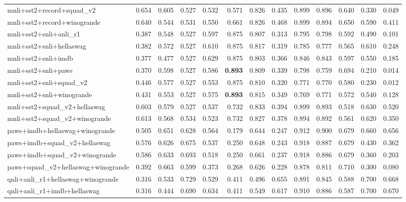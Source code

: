 \begin{table}[t]
\begin{tabular}{lrrrrrrrrrrrr}
    mnli+sst2+record+squad\_v2 & 0.654 & 0.605 & 0.527 & 0.532 & 0.571 & 0.826 & 0.435 & 0.899 & 0.896 & 0.640 & 0.330 & 0.049 \\
    mnli+sst2+record+winogrande & 0.640 & 0.544 & 0.531 & 0.550 & 0.661 & 0.826 & 0.468 & 0.899 & 0.894 & 0.650 & 0.590 & 0.411 \\
    mnli+sst2+snli+anli\_r1 & 0.387 & 0.548 & 0.527 & 0.597 & 0.875 & 0.807 & 0.313 & 0.795 & 0.798 & 0.592 & 0.490 & 0.101 \\
    mnli+sst2+snli+hellaswag & 0.382 & 0.572 & 0.527 & 0.610 & 0.875 & 0.817 & 0.319 & 0.785 & 0.777 & 0.565 & 0.610 & 0.248 \\
    mnli+sst2+snli+imdb & 0.377 & 0.477 & 0.527 & 0.629 & 0.875 & 0.803 & 0.366 & 0.846 & 0.843 & 0.597 & 0.550 & 0.185 \\
    mnli+sst2+snli+paws & 0.370 & 0.598 & 0.527 & 0.586 & \textbf{0.893} & 0.809 & 0.339 & 0.798 & 0.759 & 0.694 & 0.210 & 0.014 \\
    mnli+sst2+snli+squad\_v2 & 0.446 & 0.577 & 0.527 & 0.553 & 0.875 & 0.810 & 0.320 & 0.771 & 0.770 & 0.580 & 0.230 & 0.012 \\
    mnli+sst2+snli+winogrande & 0.431 & 0.553 & 0.527 & 0.575 & \textbf{0.893} & 0.815 & 0.349 & 0.769 & 0.771 & 0.572 & 0.540 & 0.128 \\
    mnli+sst2+squad\_v2+hellaswag & 0.603 & 0.579 & 0.527 & 0.537 & 0.732 & 0.833 & 0.394 & 0.899 & 0.893 & 0.518 & 0.630 & 0.520 \\
    mnli+sst2+squad\_v2+winogrande & 0.613 & 0.568 & 0.534 & 0.523 & 0.732 & 0.827 & 0.378 & 0.894 & 0.892 & 0.561 & 0.620 & 0.350 \\
    paws+imdb+hellaswag+winogrande & 0.505 & 0.651 & 0.628 & 0.564 & 0.179 & 0.644 & 0.247 & 0.912 & 0.900 & 0.679 & 0.660 & 0.656 \\
    paws+imdb+squad\_v2+hellaswag & 0.576 & 0.626 & 0.675 & 0.537 & 0.250 & 0.648 & 0.243 & 0.918 & 0.887 & 0.679 & 0.430 & 0.362 \\
    paws+imdb+squad\_v2+winogrande & 0.586 & 0.633 & 0.693 & 0.518 & 0.250 & 0.661 & 0.237 & 0.918 & 0.886 & 0.679 & 0.360 & 0.203 \\
    paws+squad\_v2+hellaswag+winogrande & 0.392 & 0.663 & 0.599 & 0.373 & 0.268 & 0.626 & 0.228 & 0.878 & 0.811 & 0.710 & 0.300 & 0.080 \\
    qnli+anli\_r1+hellaswag+winogrande & 0.316 & 0.533 & 0.729 & 0.529 & 0.411 & 0.496 & 0.655 & 0.891 & 0.845 & 0.588 & 0.700 & 0.668 \\
    qnli+anli\_r1+imdb+hellaswag & 0.316 & 0.444 & 0.690 & 0.634 & 0.411 & 0.549 & 0.617 & 0.910 & 0.886 & 0.587 & 0.700 & 0.670 \\

\end{tabular}
\end{table}
